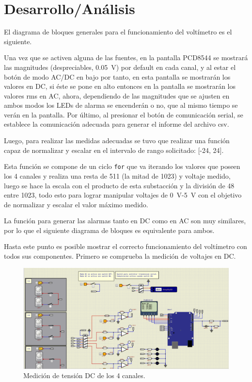 \section{Desarrollo/Análisis}
El diagrama de bloques generales para el funcionamiento del voltímetro es el siguiente.

Una vez que se activen alguna de las fuentes, en la pantalla PCD8544 se mostrará las magnitudes (despreciables, \SI{0.05}{\volt}) por default en cada canal, y al estar el botón de modo AC/DC en bajo por tanto, en esta pantalla se mostrarán los valores en DC, si éste se pone en alto entonces en la pantalla se mostrarán los valores rms en AC, ahora, dependiendo de las magnitudes que se ajusten en ambos modos los LEDs de alarma se encenderán o no, que al mismo tiempo se verán en la pantalla. Por último, al presionar el botón de comunicación serial, se establece la comunicación adecuada para generar el informe del archivo csv.\par
Luego, para realizar las medidas adecuadas se tuvo que realizar una función capaz de normalizar y escalar en el intervalo de rango solicitado: [-24, 24]. 

Esta función se compone de un ciclo \texttt{for} que va iterando los valores que poseen los 4 canales y realiza una resta de 511 (la mitad de 1023) y voltaje medido, luego se hace la escala con el producto de esta substacción y la división de 48 entre 1023, todo esto para lograr manipular voltajes de \SI{0}{\volt}-\SI{5}{\volt} con el objetivo de normalizar y escalar el valor máximo medido.\par
La función para generar las alarmas tanto en DC como en AC son muy similares, por lo que el siguiente diagrama de bloques es equivalente para ambos.

Hasta este punto es posible mostrar el correcto funcionamiento del voltímetro con todos sus componentes. Primero se comprueba la medición de voltajes en DC.
\begin{figure}[H]
    \centering
    \includegraphics[width=.8\linewidth]{Imagenes/9.png}
    \caption{Medición de tensión DC de los 4 canales.}
    \label{fig_9}
\end{figure}
